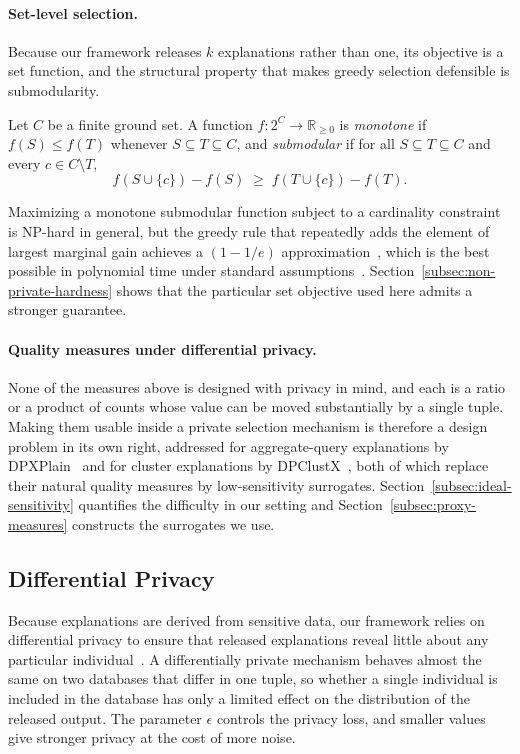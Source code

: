\paragraph{Set-level selection.}
Because our framework releases $k$ explanations rather than one, its objective is a
set function, and the structural property that makes greedy selection defensible is
submodularity.

\begin{definition}
\label{def:submodular}
Let $C$ be a finite ground set. A function $f:2^{C}\rightarrow\mathbb{R}_{\ge 0}$ is
\emph{monotone} if $f(S)\le f(T)$ whenever $S\subseteq T\subseteq C$, and
\emph{submodular} if for all $S\subseteq T\subseteq C$ and every $c\in C\setminus T$,
\[
f(S\cup\{c\})-f(S) \;\ge\; f(T\cup\{c\})-f(T).
\]
\end{definition}

Maximizing a monotone submodular function subject to a cardinality constraint is
NP-hard in general, but the greedy rule that repeatedly adds the element of largest
marginal gain achieves a $(1-1/e)$ approximation~\cite{NemhauserWF78}, which is the
best possible in polynomial time under standard
assumptions~\cite{Feige98}.
Section~\ref{subsec:non-private-hardness} shows that the particular set objective
used here admits a stronger guarantee.

\paragraph{Quality measures under differential privacy.}
None of the measures above is designed with privacy in mind, and each is a ratio or
a product of counts whose value can be moved substantially by a single tuple.
Making them usable inside a private selection mechanism is therefore a design
problem in its own right, addressed for aggregate-query explanations by
DPXPlain~\cite{TaoGMR22} and for cluster explanations by
DPClustX~\cite{DPClustX}, both of which replace their natural quality measures by
low-sensitivity surrogates.
Section~\ref{subsec:ideal-sensitivity} quantifies the difficulty in our setting and
Section~\ref{subsec:proxy-measures} constructs the surrogates we use.

\subsection{Differential Privacy}
\label{subsec:prelim-dp}
Because explanations are derived from sensitive data, our framework relies on
differential privacy to ensure that released explanations reveal little about any
particular individual~\cite{TheAlgFoundDP2014}. A differentially private mechanism
behaves almost the same on two databases that differ in one tuple, so whether a
single individual is included in the database has only a limited effect on the
distribution of the released output. The parameter $\epsilon$ controls the privacy
loss, and smaller values give stronger privacy at the cost of more noise.

